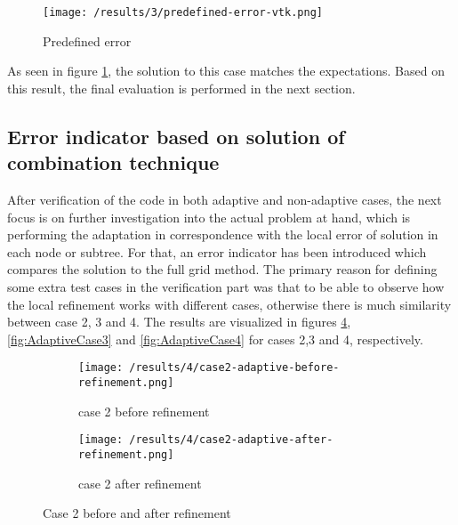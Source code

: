 
		
\begin{figure}[h]
	\centering
	    \texttt{[image: /results/3/predefined-error-vtk.png]}
		\centering    
	 \caption{Predefined error}
       \label{fig:PredefError}
\end{figure}

As seen in figure \ref{fig:PredefError}, the solution to this case matches the expectations. Based on this result, the final evaluation is performed in the next section.

\subsection{Error indicator based on solution of combination technique}
After verification of the code in both adaptive and non-adaptive cases, the next focus is on further investigation into the actual problem at hand, which is performing the adaptation in correspondence with the local error of solution in each node or subtree. For that, an error indicator has been introduced which compares the solution to the full grid method. The primary reason for defining some extra test cases in the verification part was that to be able to observe how the local refinement works with different cases, otherwise there is much similarity between case 2, 3 and 4. The results are visualized in figures \ref{fig:AdaptiveCase2}, \ref{fig:AdaptiveCase3} and \ref{fig:AdaptiveCase4} for cases 2,3 and 4, respectively. \\


\begin{figure}[h]
	\centering
    \begin{subfigure}[b]{0.49\textwidth}
	    \texttt{[image: /results/4/case2-adaptive-before-refinement.png]}
		\centering
        \caption{case 2 before refinement}
        \label{fig:AdaptiveCase2Before}
    \end{subfigure} 
    \begin{subfigure}[b]{0.49\textwidth}    
	    \texttt{[image: /results/4/case2-adaptive-after-refinement.png]}
		\centering    
	 \caption{case 2 after refinement}
       \label{fig:AdaptiveCase2After}
    \end{subfigure} 
    \caption{Case 2 before and after refinement}
    \label{fig:AdaptiveCase2}
\end{figure}

